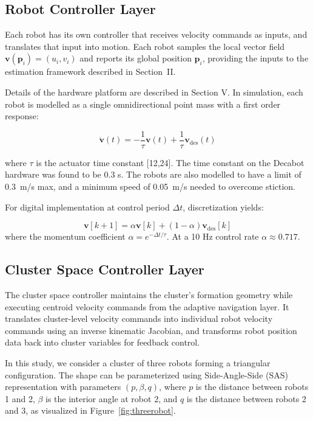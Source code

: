 \documentclass[lettersize,journal]{IEEEtran}
\begin{document}
\subsection{Robot Controller Layer}
\noindent 

Each robot has its own controller that receives velocity commands as inputs, and translates that input into motion. Each robot samples the local vector field $\mathbf{v}(\mathbf{p}_i) = (u_i, v_i)$ and reports its global position $\mathbf{p}_i$, providing the inputs to the estimation framework described in Section~II.

Details of the hardware platform are described in Section V.
In simulation, each robot is modelled as a single omnidirectional point mass with a first order response:

\begin{equation}
    \dot{\mathbf{v}}(t) = -\frac{1}{\tau}\mathbf{v}(t) + \frac{1}{\tau}\mathbf{v}_{\text{des}}(t)
    \label{eq:continuous}
    \end{equation}

where $\tau$ is the actuator time constant [12,24]. The time constant on the Decabot hardware was found to be 0.3 s.  The robots are also modelled to have a limit of 0.3~m/s max, and a minimum speed of 0.05~m/s needed to overcome stiction.

For digital implementation at control period $\Delta t$, discretization yields:

\begin{equation}
\mathbf{v}[k+1] = \alpha \mathbf{v}[k] + (1-\alpha)\mathbf{v}_{\text{des}}[k]
\label{eq:momentum}
\end{equation}
where the momentum coefficient $\alpha = e^{-\Delta t/\tau}$. At a 10 Hz control rate $\alpha \approx 0.717$. 


\subsection{Cluster Space Controller Layer}

The cluster space controller maintains the cluster's formation geometry while executing centroid velocity commands from the adaptive navigation layer. It translates cluster-level velocity commands into individual robot velocity commands using an inverse kinematic Jacobian, and transforms robot position data back into cluster variables for feedback control.

In this study, we consider a cluster of three robots forming a triangular configuration. The shape can be parameterized using Side-Angle-Side (SAS) representation with parameters $(p, \beta, q)$, where $p$ is the distance between robots 1 and 2, $\beta$ is the interior angle at robot 2, and $q$ is the distance between robots 2 and 3, as visualized in Figure~\ref{fig:threerobot}.
\end{document}

